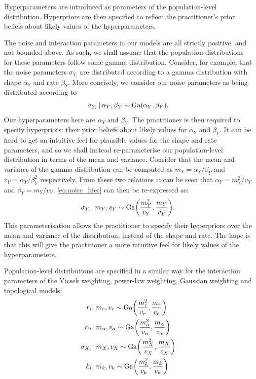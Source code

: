 Hyperparameters are introduced as parameters of the population-level
distribution. Hyperpriors are then specified to reflect the practitioner's
prior beliefs about likely values of the hyperparameters.

The noise and interaction parameters in our models are all strictly positive,
and not bounded above. As such, we shall assume that the population
distributions for these parameters follow some gamma distribution. Consider,
for example, that the noise parameters $\sigma_{Y_i}$ are distributed according
to a gamma distribution with shape $\alpha_Y$ and rate $\beta_Y$. More
concisely, we consider our noise parameters as being distributed according to
\begin{equation}
    \label{eq:noise_hier}
    \sigma_{Y_i}\,|\,\alpha_Y,\beta_Y \sim \textrm{Ga}(\alpha_Y, \beta_Y).
\end{equation}
Our hyperparameters here are $\alpha_Y$ and $\beta_Y$. The practitioner is then
required to specify hyperpriors: their prior beliefs about likely values for
$\alpha_Y$ and $\beta_Y$. It can be hard to get an intuitive feel for plausible
values for the shape and rate parameters, and so we shall instead
re-parameterise our population-level distribution in terms of the mean and
variance. Consider that the mean and variance of the gamma distribution can be
computed as $m_Y = \alpha_Y / \beta_Y$ and $v_Y = \alpha_Y/\beta_Y^2$
respectively. From these two relations it can be seen that $\alpha_Y = m_Y^2 /
v_Y$ and $\beta_Y = m_Y / v_Y$. \cref{eq:noise_hier} can then be re-expressed
as:
\begin{equation}
    \label{eq:sigma_Y_hierarchy}
    \sigma_{Y_i}\,|\, m_Y, v_Y \sim \textrm{Ga}\bigg(\frac{m_Y^2}{v_Y},
                                              \frac{m_Y}{v_Y}\bigg).
\end{equation}
This parameterisation allows the practitioner to specify their hyperpriors over
the mean and variance of the distribution, instead of the shape and rate. The
hope is that this will give the practitioner a more intuitive feel for likely
values of the hyperparameters.

Population-level distributions are specified in a similar way for the
interaction parameters of the Vicsek weighting, power-law weighting, Gaussian
weighting and topological models:
\begin{align}
    r_i &\,|\, m_r, v_r  \sim \textrm{Ga}\bigg(\frac{m_r^2}{v_r}, \frac{m_r}{v_r}\bigg)\\
    \alpha_i &\,|\, m_{\alpha}, v_{\alpha}  \sim
        \textrm{Ga}\bigg(\frac{m_{\alpha}^2}{v_{\alpha}}, \frac{m_{\alpha}}{v_{\alpha}}\bigg)\\
    \sigma_{X_i} &\,|\, m_X, v_X  \sim \textrm{Ga}\bigg(\frac{m_X^2}{v_X}, \frac{m_X}{v_X}\bigg)
    \label{eq:sigma_X_hierarchy}\\
    k_i &\,|\, m_k, v_k  \sim \textrm{Ga}\bigg(\frac{m_k^2}{v_k}, \frac{m_k}{v_k}\bigg)
\end{align}

